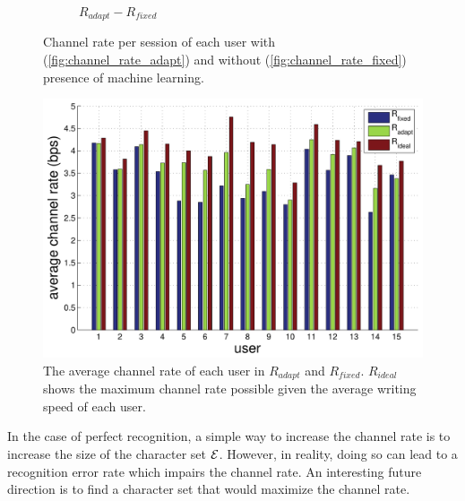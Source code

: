 \documentclass{sigchi}
\begin{document}
\begin{figure}
\begin{subfigure}[b]{0.3\textwidth}
    \caption{$R_{adapt} - R_{fixed}$}
    \label{fig:channel_rate_diff}
  \end{subfigure}
  \label{fig:channel_rate}
  \caption{Channel rate per session of each user with
    (\ref{fig:channel_rate_adapt}) and without (\ref{fig:channel_rate_fixed})
    presence of machine learning. }
\end{figure}

\begin{figure}
  \centering
  \includegraphics[width=.5\textwidth]{figures/IUI_user_summary.pdf}   
  \caption{The average channel rate of each user in $R_{adapt}$ and
    $R_{fixed}$. $R_{ideal}$ shows the maximum channel rate possible given the
    average writing speed of each user. }
  \label{fig:channel_rate_per_user}
\end{figure}

In the case of perfect recognition, a simple way to increase the
channel rate is to increase the size of the character set
$\mathcal{E}$. However, in reality, doing so can lead to a
recognition error rate which impairs the channel rate. An interesting
future direction is to find a character set that would maximize the channel
rate. 
\end{document}

